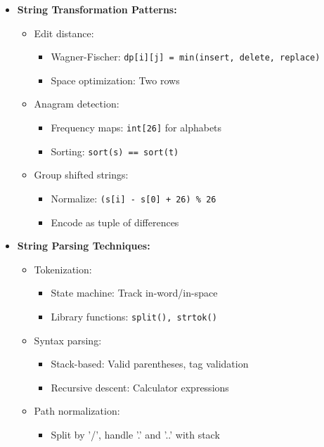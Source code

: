 \documentclass[a4paper,10pt]{book}
\begin{document}
\begin{itemize}
    \item \textbf{String Transformation Patterns:}
    \begin{itemize}
        \item Edit distance:
        \begin{itemize}
            \item Wagner-Fischer: \texttt{dp[i][j] = min(insert, delete, replace)}
            \item Space optimization: Two rows
        \end{itemize}
        \item Anagram detection:
        \begin{itemize}
            \item Frequency maps: \texttt{int[26]} for alphabets
            \item Sorting: \texttt{sort(s) == sort(t)}
        \end{itemize}
        \item Group shifted strings:
        \begin{itemize}
            \item Normalize: \texttt{(s[i] - s[0] + 26) \% 26}
            \item Encode as tuple of differences
        \end{itemize}
    \end{itemize}
    
    \item \textbf{String Parsing Techniques:}
    \begin{itemize}
        \item Tokenization:
        \begin{itemize}
            \item State machine: Track in-word/in-space
            \item Library functions: \texttt{split(), strtok()}
        \end{itemize}
        \item Syntax parsing:
        \begin{itemize}
            \item Stack-based: Valid parentheses, tag validation
            \item Recursive descent: Calculator expressions
        \end{itemize}
        \item Path normalization:
        \begin{itemize}
            \item Split by '/', handle '.' and '..' with stack
        \end{itemize}
    \end{itemize}
    

\end{itemize}
\end{document}
